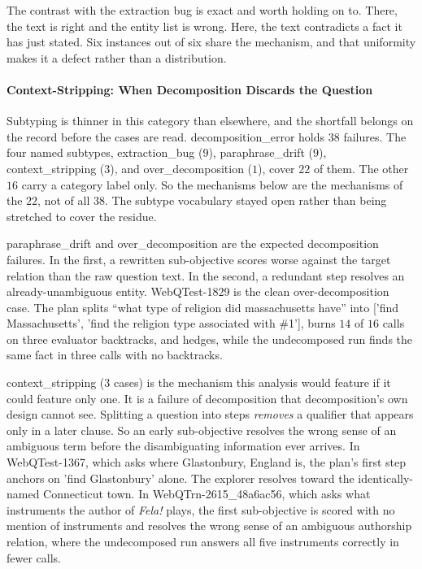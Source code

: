 The contrast with the extraction bug is exact and worth holding on to. There,
the text is right and the entity list is wrong. Here, the text contradicts a
fact it has just stated. Six instances out of six share the mechanism, and that
uniformity makes it a defect rather than a distribution.

\paragraph{Context-Stripping: When Decomposition Discards the Question}

Subtyping is thinner in this category than elsewhere, and the shortfall
belongs on the record before the cases are read.
\textsf{decomposition\_error} holds $38$ failures. The four named subtypes,
\textsf{extraction\_bug} ($9$), \textsf{paraphrase\_drift} ($9$),
\textsf{context\_stripping} ($3$), and \textsf{over\_decomposition} ($1$), cover
$22$ of them. The other $16$ carry a category label only. So the mechanisms
below are the mechanisms of the $22$, not of all $38$. The subtype vocabulary
stayed open rather than being stretched to cover the residue.

\textsf{paraphrase\_drift} and \textsf{over\_decomposition} are the expected
decomposition failures. In the first, a rewritten sub-objective scores worse
against the target relation than the raw question text. In the second, a
redundant step resolves an already-unambiguous entity. \textsf{WebQTest-1829} is
the clean over-decomposition case. The plan splits ``what type of religion did
massachusetts have'' into \textsf{['find Massachusetts', 'find the religion type
associated with \#1']}, burns $14$ of $16$ calls on three evaluator backtracks,
and hedges, while the undecomposed run finds the same fact in three calls with
no backtracks.

\textsf{context\_stripping} ($3$ cases) is the mechanism this analysis would
feature if it could feature only one. It is a failure of decomposition that
decomposition's own design cannot see. Splitting a question into steps
\emph{removes} a qualifier that appears only in a later clause. So an early
sub-objective resolves the wrong sense of an ambiguous term before the
disambiguating information ever arrives. In \textsf{WebQTest-1367}, which asks
where Glastonbury, England is, the plan's first step anchors on \textsf{'find
Glastonbury'} alone. The explorer resolves toward the identically-named
Connecticut town. In \textsf{WebQTrn-2615\_48a6ac56}, which asks what
instruments the author of \emph{Fela!} plays, the first sub-objective is scored
with no mention of instruments and resolves the wrong sense of an ambiguous
authorship relation, where the undecomposed run answers all five instruments
correctly in fewer calls.

